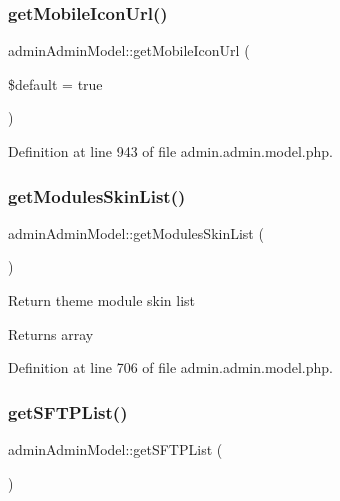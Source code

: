 \hypertarget{classadminAdminModel_a3ebcb91feca1cf88d6ed0bce9355ca6b}{}\label{classadminAdminModel_a3ebcb91feca1cf88d6ed0bce9355ca6b} 
\subsubsection{\texorpdfstring{get\+Mobile\+Icon\+Url()}{getMobileIconUrl()}}
{\footnotesize\ttfamily admin\+Admin\+Model\+::get\+Mobile\+Icon\+Url (\begin{DoxyParamCaption}\item[{}]{\$default = {\ttfamily true} }\end{DoxyParamCaption})}



Definition at line 943 of file admin.\+admin.\+model.\+php.

\hypertarget{classadminAdminModel_adde903c6e5edecd8b68b1afb232c92fe}{}\label{classadminAdminModel_adde903c6e5edecd8b68b1afb232c92fe} 
\subsubsection{\texorpdfstring{get\+Modules\+Skin\+List()}{getModulesSkinList()}}
{\footnotesize\ttfamily admin\+Admin\+Model\+::get\+Modules\+Skin\+List (\begin{DoxyParamCaption}{ }\end{DoxyParamCaption})}

Return theme module skin list \begin{DoxyReturn}{Returns}
array 
\end{DoxyReturn}


Definition at line 706 of file admin.\+admin.\+model.\+php.

\hypertarget{classadminAdminModel_adea58838b8595a28dc84d562bd1816ed}{}\label{classadminAdminModel_adea58838b8595a28dc84d562bd1816ed} 
\subsubsection{\texorpdfstring{get\+S\+F\+T\+P\+List()}{getSFTPList()}}
{\footnotesize\ttfamily admin\+Admin\+Model\+::get\+S\+F\+T\+P\+List (\begin{DoxyParamCaption}{ }\end{DoxyParamCaption})}

